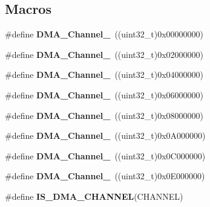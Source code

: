 \subsection*{Macros}
\begin{DoxyCompactItemize}
\item 
\mbox{\label{group___d_m_a__channel_ga4979fc18bd59701dec52c8fa89b5edb2}} 
\#define {\bfseries D\+M\+A\+\_\+\+Channel\+\_}~((uint32\+\_\+t)0x00000000)
\item 
\mbox{\label{group___d_m_a__channel_gacad41f71e3a940abd495b0aab3b4e8cb}} 
\#define {\bfseries D\+M\+A\+\_\+\+Channel\+\_}~((uint32\+\_\+t)0x02000000)
\item 
\mbox{\label{group___d_m_a__channel_ga6b5d9fcfd72335777ce2796af6300574}} 
\#define {\bfseries D\+M\+A\+\_\+\+Channel\+\_}~((uint32\+\_\+t)0x04000000)
\item 
\mbox{\label{group___d_m_a__channel_gaf835103c99f21d1b1c04d5c98471c1d5}} 
\#define {\bfseries D\+M\+A\+\_\+\+Channel\+\_}~((uint32\+\_\+t)0x06000000)
\item 
\mbox{\label{group___d_m_a__channel_gac8a40bf3a421b434177e988263a3d787}} 
\#define {\bfseries D\+M\+A\+\_\+\+Channel\+\_}~((uint32\+\_\+t)0x08000000)
\item 
\mbox{\label{group___d_m_a__channel_gae3dd5d28def40846aea8e3013d63311b}} 
\#define {\bfseries D\+M\+A\+\_\+\+Channel\+\_}~((uint32\+\_\+t)0x0\+A000000)
\item 
\mbox{\label{group___d_m_a__channel_ga141e89570dabba4f778e8e8df80e7812}} 
\#define {\bfseries D\+M\+A\+\_\+\+Channel\+\_}~((uint32\+\_\+t)0x0\+C000000)
\item 
\mbox{\label{group___d_m_a__channel_ga14f1265827ce49dad5075986118cc542}} 
\#define {\bfseries D\+M\+A\+\_\+\+Channel\+\_}~((uint32\+\_\+t)0x0\+E000000)
\item 
\#define {\bfseries I\+S\+\_\+\+D\+M\+A\+\_\+\+C\+H\+A\+N\+N\+EL}(C\+H\+A\+N\+N\+EL)
\end{DoxyCompactItemize}


